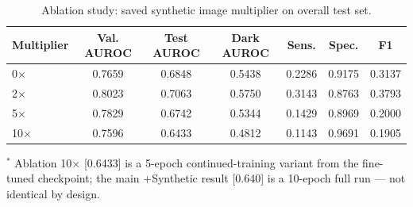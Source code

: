 \begin{table}[htbp]
\centering
\caption{Ablation study: saved synthetic image multiplier on overall test set.}
\label{tab:ablation}
\begin{tabular}{lcccccc}
\toprule
\textbf{Multiplier} & Val. AUROC & Test AUROC & Dark AUROC & Sens. & Spec. & F1 \\
\midrule
0$\times$ & 0.7659 & 0.6848 & 0.5438 & 0.2286 & 0.9175 & 0.3137 \\
2$\times$ & 0.8023 & 0.7063 & 0.5750 & 0.3143 & 0.8763 & 0.3793 \\
5$\times$ & 0.7829 & 0.6742 & 0.5344 & 0.1429 & 0.8969 & 0.2000 \\
10$\times$ & 0.7596 & 0.6433 & 0.4812 & 0.1143 & 0.9691 & 0.1905 \\
\bottomrule
\end{tabular}
\vspace{2pt}
\footnotesize{$^*$ Ablation 10$\times$ [0.6433] is a 5-epoch continued-training variant from the fine-tuned checkpoint; the main +Synthetic result [0.640] is a 10-epoch full run --- not identical by design.}
\end{table}
